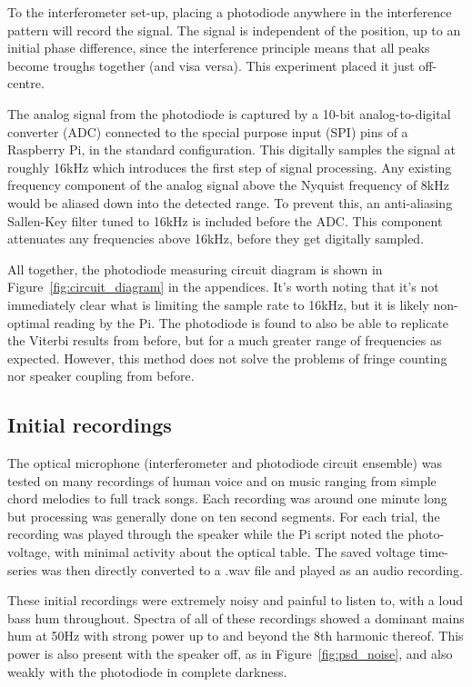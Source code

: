 \documentclass[prb,preprint]{revtex4-1}
\begin{document}
To the interferometer set-up, placing a photodiode anywhere in the interference pattern will record the signal. The signal is independent of the position, up to an initial phase difference, since the interference principle means that all peaks become troughs together (and visa versa). This experiment placed it just off-centre.


The analog signal from the photodiode is captured by a 10-bit analog-to-digital converter (ADC) connected to the special purpose input (SPI) pins of a Raspberry Pi, in the standard configuration. This digitally samples the signal at roughly 16kHz which introduces the first step of signal processing. Any existing frequency component of the analog signal above the Nyquist frequency of 8kHz would be aliased down into the detected range. To prevent this, an anti-aliasing Sallen-Key filter tuned to 16kHz is included before the ADC. This component attenuates any frequencies above 16kHz, before they get digitally sampled.


All together, the photodiode measuring circuit diagram is shown in Figure~\ref{fig:circuit_diagram} in the appendices. It’s worth noting that it’s not immediately clear what is limiting the sample rate to 16kHz, but it is likely non-optimal reading by the Pi.
The photodiode is found to also be able to replicate the Viterbi results from before, but for a much greater range of frequencies as expected. However, this method does not solve the problems of fringe counting nor speaker coupling from before.


\subsection{Initial recordings}

The optical microphone (interferometer and photodiode circuit ensemble) was tested on many recordings of human voice and on music ranging from simple chord melodies to full track songs. Each recording was around one minute long but processing was generally done on ten second segments. For each trial, the recording was played through the speaker while the Pi script noted the photo-voltage, with minimal activity about the optical table. The saved  voltage time-series was then directly converted to a .wav file and played as an audio recording.


These initial recordings were extremely noisy and painful to listen to, with a loud bass hum throughout. Spectra of all of these recordings showed a dominant mains hum at 50Hz with strong power up to and beyond the 8th harmonic thereof. This power is also present with the speaker off, as in Figure~\ref{fig:psd_noise}, and also weakly with the photodiode in complete darkness.
\end{document}
